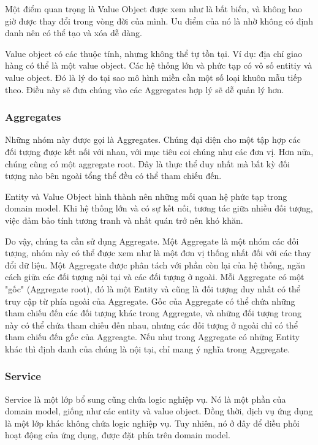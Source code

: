 Một điểm quan trọng là Value Object được xem như là bất biến, và không bao giờ được thay đổi trong vòng đời của mình. Ưu điểm của nó là nhờ không có định danh nên có thể tạo và xóa dễ dàng.

Value object có các thuộc tính, nhưng không thể tự tồn tại. Ví dụ: địa chỉ giao hàng có thể là một value object. Các hệ thống lớn và phức tạp có vô số entitiy và value object. Đó là lý do tại sao mô hình miền cần một số loại khuôn mẫu tiếp theo. Điều này sẽ đưa chúng vào các Aggregates hợp lý sẽ dễ quản lý hơn.

\subsubsection{Aggregates}

Những nhóm này được gọi là Aggregates. Chúng đại diện cho một tập hợp các đối tượng được kết nối với nhau, với mục tiêu coi chúng như các đơn vị. Hơn nữa, chúng cũng có một aggregate root. Đây là thực thể duy nhất mà bất kỳ đối tượng nào bên ngoài tổng thể đều có thể tham chiếu đến.

Entity và Value Object hình thành nên những mối quan hệ phức tạp trong domain model. Khi hệ thống lớn và có sự kết nối, tương tác giữa nhiều đối tượng, việc đảm bảo tính tương tranh và nhất quán trở nên khó khăn.

Do vậy, chúng ta cần sử dụng Aggregate. Một Aggregate là một nhóm các đối tượng, nhóm này có thể được xem như là một đơn vị thống nhất đối với các thay đổi dữ liệu. Một Aggregate được phân tách với phần còn lại của hệ thống, ngăn cách giữa các đối tượng nội tại và các đối tượng ở ngoài. Mỗi Aggregate có một "gốc" (Aggregate root), đó là một Entity và cũng là đối tượng duy nhất có thể truy cập từ phía ngoài của Aggregate. Gốc của Aggregate có thể chứa những tham chiếu đến các đối tượng khác trong Aggregate, và những đối tượng trong này có thể chứa tham chiếu đến nhau, nhưng các đối tượng ở ngoài chỉ có thể tham chiếu đến gốc của Aggreagte. Nếu như trong Aggregate có những Entity khác thì định danh của chúng là nội tại, chỉ mang ý nghĩa trong Aggregate.

\subsubsection{Service}

Service là một lớp bổ sung cũng chứa logic nghiệp vụ. Nó là một phần của domain model, giống như các entity và value object. Đồng thời, dịch vụ ứng dụng là một lớp khác không chứa logic nghiệp vụ. Tuy nhiên, nó ở đây để điều phối hoạt động của ứng dụng, được đặt phía trên domain model.

